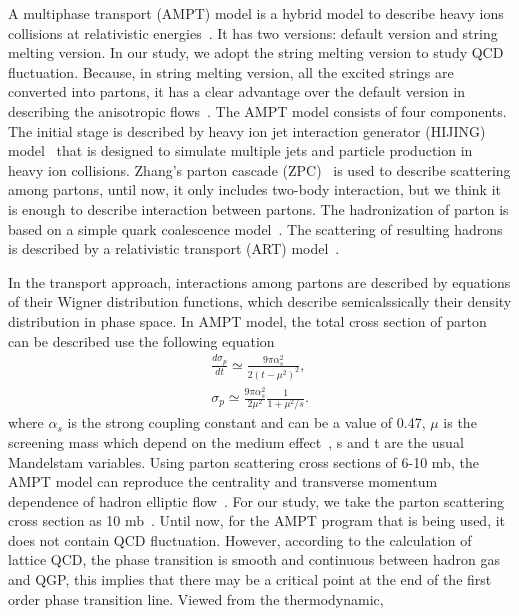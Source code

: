 \documentclass[twocolumn,aps,prc,showpacs,superscriptaddress,preprintnumbers,floatfix,nofootinbib]{revtex4}
\begin{document}
\begin{CJK*}{GBK}{song}
  A multiphase transport (AMPT) model is a hybrid model to describe heavy ions
  collisions at relativistic energies~\cite{AMPT1,AMPT2,AMPT3,AMPT4}. It has two
  versions: default version and string melting version. In our study, we adopt the
  string melting version to study QCD fluctuation. Because, in string melting version,
  all the excited strings are converted into partons, it has a clear advantage
  over the default version in describing the anisotropic flows~\cite{FLOW1}.
  The AMPT model consists of four components. The initial stage is described by heavy
  ion jet interaction generator (HIJING) model~\cite{HIJING1,HIJING2} that is designed to
  simulate multiple jets and particle production in heavy ion collisions. Zhang's
  parton cascade (ZPC)~\cite{ZPC} is used to describe scattering among partons,
  until now, it only includes two-body interaction, but we think it is enough to
  describe interaction between partons. The hadronization of parton is based on a
  simple quark coalescence model~\cite{AMPT3}. The scattering of resulting hadrons is
  described by a relativistic transport (ART) model~\cite{ART1,ART2}.
  \par
  In the transport approach, interactions among partons are described by
  equations of their Wigner distribution functions, which describe semicalssically
  their density distribution in phase space. In AMPT model, the total cross section
  of parton can be described use the following equation~\cite{ZPC}
  \begin{gather}
    \label{eq:equationcrosssection}
    \frac{d\sigma_{p}}{dt} \simeq \frac{9\pi\alpha_{s}^{2}}{2(t-\mu^{2})^{2}},\\
    \sigma_{p} \simeq \frac{9\pi\alpha_{s}^{2}}{2\mu^{2}}\frac{1}{1+\mu^{2}/s}.
  \end{gather}
  where $\alpha_{s}$ is the strong coupling constant and can be a value of 0.47,
  $\mu$ is the screening mass which depend on the medium effect~\cite{ZPC},
  s and t are the usual Mandelstam variables. Using parton scattering cross sections
  of 6-10 mb, the AMPT model can reproduce the centrality and transverse momentum
  dependence of hadron elliptic flow~\cite{CROSSSECTION}. For our study, we take the
  parton scattering cross section as 10 mb~\cite{TENMB}. Until now, for the AMPT program that
  is being used, it does not contain QCD fluctuation. However, according to the
  calculation of lattice QCD, the phase transition is smooth and continuous between
  hadron gas and QGP, this implies that there may be a critical point at the
  end of the first order phase transition line. Viewed from the thermodynamic,

\end{CJK*}
\end{document}
